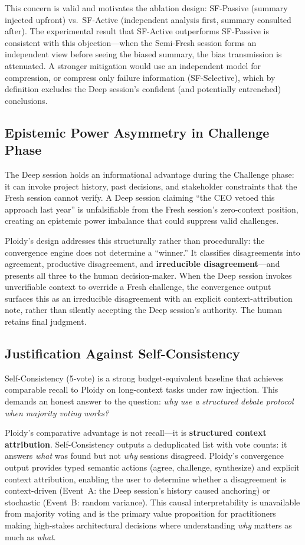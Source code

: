 \documentclass[11pt]{article}
\begin{document}
This concern is valid and motivates the ablation design: SF-Passive (summary injected upfront) vs.\ SF-Active (independent analysis first, summary consulted after). The experimental result that SF-Active outperforms SF-Passive is consistent with this objection---when the Semi-Fresh session forms an independent view before seeing the biased summary, the bias transmission is attenuated. A stronger mitigation would use an independent model for compression, or compress only failure information (SF-Selective), which by definition excludes the Deep session's confident (and potentially entrenched) conclusions.

\subsection{Epistemic Power Asymmetry in Challenge Phase}
\label{sec:epistemic-power}

The Deep session holds an informational advantage during the Challenge phase: it can invoke project history, past decisions, and stakeholder constraints that the Fresh session cannot verify. A Deep session claiming ``the CEO vetoed this approach last year'' is unfalsifiable from the Fresh session's zero-context position, creating an epistemic power imbalance that could suppress valid challenges.

Ploidy's design addresses this structurally rather than procedurally: the convergence engine does not determine a ``winner.'' It classifies disagreements into agreement, productive disagreement, and \textbf{irreducible disagreement}---and presents all three to the human decision-maker. When the Deep session invokes unverifiable context to override a Fresh challenge, the convergence output surfaces this as an irreducible disagreement with an explicit context-attribution note, rather than silently accepting the Deep session's authority. The human retains final judgment.

\subsection{Justification Against Self-Consistency}
\label{sec:vs-self-consistency}

Self-Consistency (5-vote) is a strong budget-equivalent baseline that achieves comparable recall to Ploidy on long-context tasks under raw injection. This demands an honest answer to the question: \emph{why use a structured debate protocol when majority voting works?}

Ploidy's comparative advantage is not recall---it is \textbf{structured context attribution}. Self-Consistency outputs a deduplicated list with vote counts: it answers \emph{what} was found but not \emph{why} sessions disagreed. Ploidy's convergence output provides typed semantic actions (agree, challenge, synthesize) and explicit context attribution, enabling the user to determine whether a disagreement is context-driven (Event~A: the Deep session's history caused anchoring) or stochastic (Event~B: random variance). This causal interpretability is unavailable from majority voting and is the primary value proposition for practitioners making high-stakes architectural decisions where understanding \emph{why} matters as much as \emph{what}.
\end{document}
